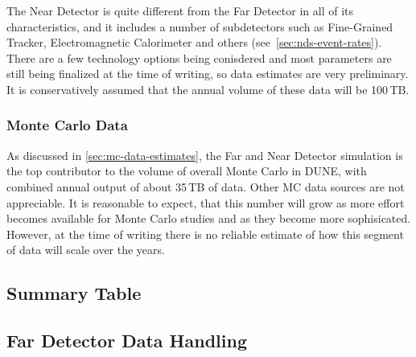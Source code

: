 The Near Detector is quite different from the Far Detector in all of its characteristics, and it includes a number of subdetectors
such as Fine-Grained Tracker, Electromagnetic Calorimeter and others (see~\ref{sec:nds-event-rates}). There are a few technology
options being conisdered and most parameters are still being finalized at the time of writing, so data estimates are very preliminary.
It is conservatively assumed that the annual volume of these data will be 100\,TB.


\subsubsection{Monte Carlo Data}
As discussed in \ref{sec:mc-data-estimates}, the Far and Near Detector simulation is the top contributor to the volume of overall
Monte Carlo in DUNE, with combined annual output of about 35\,TB of data. Other MC data sources are not appreciable.
It is reasonable to expect, that this number will grow as more effort becomes available for Monte Carlo studies and
as they become more sophisicated. However, at the time of writing there is no reliable estimate of how this segment of data
will scale over the years.


\subsection{Summary Table}

\subsection{Far Detector Data Handling}
